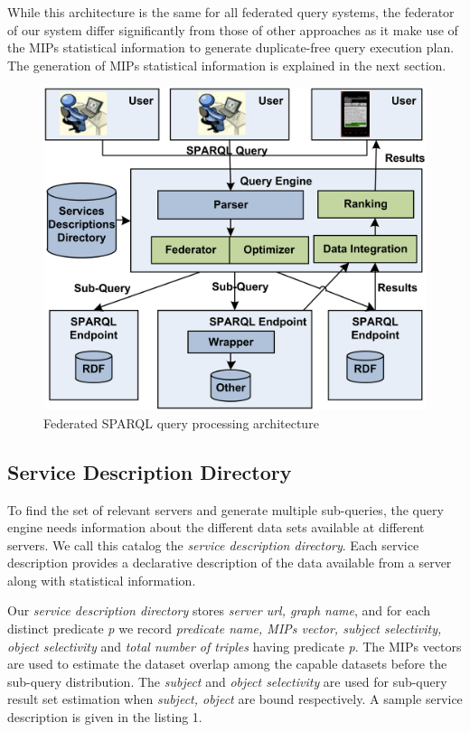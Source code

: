 \documentclass{sig-alternate}  %
\begin{document}
 While this architecture is the same
for all federated query systems, the federator of our
system differ significantly from those of other approaches as it
make use of the MIPs statistical information to generate duplicate-free
query execution plan. The generation of MIPs statistical information
is explained in the next section.
\begin{figure}
\begin{centering}
\includegraphics[scale=0.11]{img/Fig1} 
\par\end{centering}

\centering{}\caption{Federated SPARQL query processing architecture}
\end{figure}

\subsection{Service Description Directory}
To find the set of relevant servers and generate 
multiple sub-queries, the query engine needs information about the
different data sets available at different servers. We call this catalog
the \emph{service description directory}. Each service description
provides a declarative description of the data available from a server
along with statistical information. 

Our \emph{service description directory} stores \textit{server url, graph name}, and for
each distinct predicate \emph{p} we record \textit{predicate name,
MIPs vector, subject selectivity, object selectivity} and \textit{total number of triples} having predicate
\emph{p}. The MIPs vectors are used to estimate the dataset overlap
among the capable datasets before the sub-query distribution. The \emph{subject} and \emph{object selectivity} are used for sub-query result set estimation when \emph{subject, object} are bound respectively. A sample service description is given in the listing 1.
\end{document}
